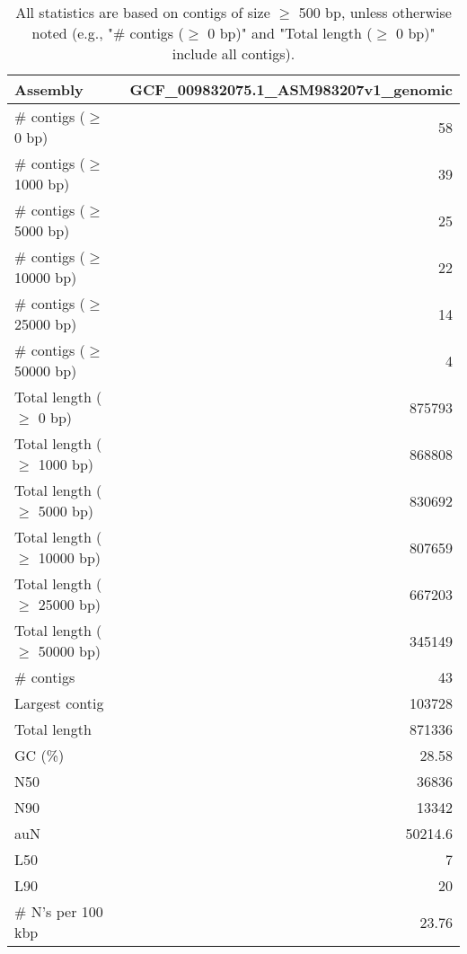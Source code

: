 \documentclass[12pt,a4paper]{article}
\begin{document}
\begin{table}[ht]
\begin{center}
\caption{All statistics are based on contigs of size $\geq$ 500 bp, unless otherwise noted (e.g., "\# contigs ($\geq$ 0 bp)" and "Total length ($\geq$ 0 bp)" include all contigs).}
\begin{tabular}{|l*{1}{|r}|}
\hline
Assembly & GCF\_009832075.1\_ASM983207v1\_genomic \\ \hline
\# contigs ($\geq$ 0 bp) & 58 \\ \hline
\# contigs ($\geq$ 1000 bp) & 39 \\ \hline
\# contigs ($\geq$ 5000 bp) & 25 \\ \hline
\# contigs ($\geq$ 10000 bp) & 22 \\ \hline
\# contigs ($\geq$ 25000 bp) & 14 \\ \hline
\# contigs ($\geq$ 50000 bp) & 4 \\ \hline
Total length ($\geq$ 0 bp) & 875793 \\ \hline
Total length ($\geq$ 1000 bp) & 868808 \\ \hline
Total length ($\geq$ 5000 bp) & 830692 \\ \hline
Total length ($\geq$ 10000 bp) & 807659 \\ \hline
Total length ($\geq$ 25000 bp) & 667203 \\ \hline
Total length ($\geq$ 50000 bp) & 345149 \\ \hline
\# contigs & 43 \\ \hline
Largest contig & 103728 \\ \hline
Total length & 871336 \\ \hline
GC (\%) & 28.58 \\ \hline
N50 & 36836 \\ \hline
N90 & 13342 \\ \hline
auN & 50214.6 \\ \hline
L50 & 7 \\ \hline
L90 & 20 \\ \hline
\# N's per 100 kbp & 23.76 \\ \hline
\end{tabular}
\end{center}
\end{table}
\end{document}
